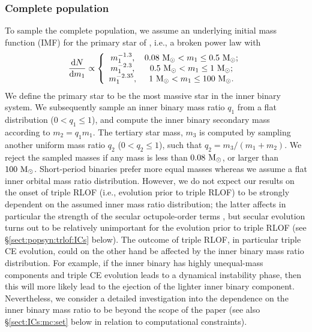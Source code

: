 \documentclass[twocolumn,appendixfloats,tighten]{aastex631}
\def\msun{{\rm\,M_\odot}}
\begin{document}
\subsubsection{Complete population}
\label{sect:ICs:mc:com}
To sample the complete population, we assume an underlying initial mass function (IMF) for the primary star of \citet{2001MNRAS.322..231K,2002Sci...295...82K}, i.e., a broken power law with
\begin{align}
\label{eq:imf}
\frac{\mathrm{d}N}{\mathrm{d} m_1} \propto \left \{ 
\begin{array}{cc} 
m_1^{-1.3}, & 0.08\,\msun<m_1\leq0.5 \, \msun; \\
m_1^{-2.3}, & 0.5\,\msun<m_1\leq1\,\msun; \\
m_1^{-2.35}, & 1\,\msun<m_1\leq100\,\msun.
\end{array}
\right.
\end{align}
We define the primary star to be the most massive star in the inner binary system. We subsequently sample an inner binary mass ratio $q_1$ from a flat distribution ($0<q_1\leq1$), and compute the inner binary secondary mass according to $m_2 = q_1 m_1$. The tertiary star mass, $m_3$ is computed by sampling another uniform mass ratio $q_2$ ($0<q_2\leq 1$), such that $q_2 = m_3/(m_1+m_2)$. We reject the sampled masses if any mass is less than $0.08\,\msun$, or larger than $100\,\msun$. Short-period binaries prefer more equal masses \citep[e.g.,][]{2000A&A...360..997T,2003A&A...397..159H,2006ApJ...639L..67P,2017ApJS..230...15M} whereas we assume a flat inner orbital mass ratio distribution. However, we do not expect our results on the onset of triple RLOF (i.e., evolution prior to triple RLOF) to be strongly dependent on the assumed inner mass ratio distribution; the latter affects in particular the strength of the secular octupole-order terms \citep[e.g.,][]{2011ApJ...742...94L}, but secular evolution turns out to be relatively unimportant for the evolution prior to triple RLOF (see \S\ref{sect:popsyn:trlof:ICs} below). The outcome of triple RLOF, in particular triple CE evolution, could on the other hand be affected by the inner binary mass ratio distribution. For example, if the inner binary has highly unequal-mass components and triple CE evolution leads to a dynamical instability phase, then this will more likely lead to the ejection of the lighter inner binary component. Nevertheless, we consider a detailed investigation into the dependence on the inner binary mass ratio to be beyond the scope of the paper (see also \S\ref{sect:ICs:mc:set} below in relation to computational constraints). 
\end{document}
